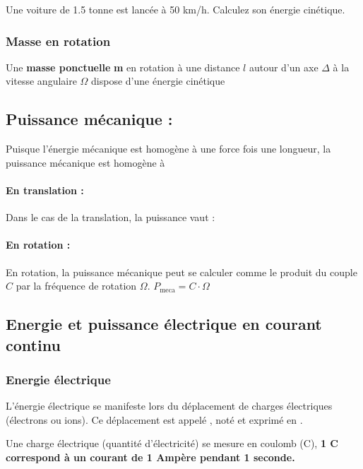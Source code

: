 \documentclass[10pt,fleqn]{article} %
\begin{document}
\begin{exemple}
    Une voiture de 1.5 tonne est lancée à 50 km/h. Calculez son énergie cinétique. 

\afaire {}

\correction{}
\end{exemple}


\subsubsection{Masse en rotation}
\begin{defi}
  Une \textbf{masse ponctuelle} \textbf{m} en rotation à une distance $l$ autour d'un axe $\Delta$ à la vitesse angulaire $\Omega$ dispose d'une énergie cinétique 
\end{defi}


\subsection{Puissance mécanique : }
Puisque l'énergie mécanique est homogène à une force fois une longueur, la puissance mécanique est homogène à 

\begin{defi}
  \paragraph{En translation : } Dans le cas de la translation, la puissance vaut : 
\paragraph{En rotation : }En rotation, la puissance mécanique peut se calculer comme le produit du couple $C$ par la fréquence de rotation $\Omega$. 
$P_{\text{meca}} = C \cdot \Omega$
\end{defi}


\subsection{Energie et puissance électrique en courant continu}
\subsubsection{Energie électrique}
\begin{defi}
  L'énergie électrique se manifeste lors du déplacement de charges électriques (électrons ou ions). Ce déplacement est appelé , noté  et exprimé en .

Une charge électrique (quantité d'électricité) se mesure en coulomb (C), \textbf{1 C correspond à un courant de 1 Ampère pendant 1 seconde.}
\end{defi}
\end{document}
